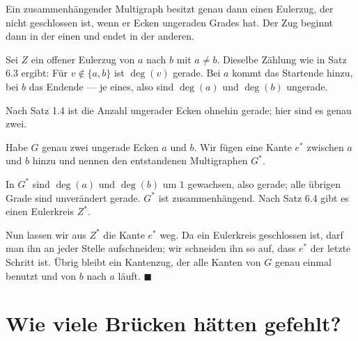 \begin{merksatz}
Ein zusammenhängender Multigraph besitzt genau dann einen Eulerzug, der nicht geschlossen ist, wenn er  Ecken ungeraden Grades hat. Der Zug beginnt dann in der einen und endet in der anderen.

Sei $Z$ ein offener Eulerzug von $a$ nach $b$ mit $a \neq b$. Dieselbe Zählung wie in Satz 6.3 ergibt: Für $v \notin \{a,b\}$ ist $\deg(v)$ gerade. Bei $a$ kommt das Startende hinzu, bei $b$ das Endende --- je eines, also sind $\deg(a)$ und $\deg(b)$ ungerade.

Nach Satz 1.4 ist die Anzahl ungerader Ecken ohnehin gerade; hier sind es genau zwei.

Habe $G$ genau zwei ungerade Ecken $a$ und $b$. Wir fügen eine  Kante $e^{*}$ zwischen $a$ und $b$ hinzu und nennen den entstandenen Multigraphen $G^{*}$.

In $G^{*}$ sind $\deg(a)$ und $\deg(b)$ um $1$ gewachsen, also gerade; alle übrigen Grade sind unverändert gerade. $G^{*}$ ist zusammenhängend. Nach Satz 6.4 gibt es einen Eulerkreis $Z^{*}$.

Nun lassen wir aus $Z^{*}$ die Kante $e^{*}$ weg. Da ein Eulerkreis geschlossen ist, darf man ihn an jeder Stelle aufschneiden; wir schneiden ihn so auf, dass $e^{*}$ der letzte Schritt ist. Übrig bleibt ein Kantenzug, der alle Kanten von $G$ genau einmal benutzt und von $b$ nach $a$ läuft. $\blacksquare$

\begin{center}
\begin{minipage}{0.88\textwidth}
\end{minipage}
\end{center}
\end{merksatz}

\section{Wie viele Brücken hätten gefehlt?}

